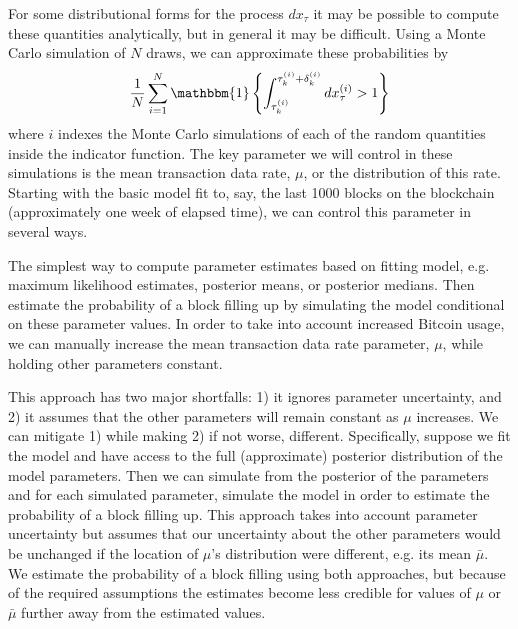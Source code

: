 \documentclass{article}
\begin{document}
For some distributional forms for the process $dx_\tau$ it may be possible to compute these quantities analytically, but in general it may be difficult. Using a Monte Carlo simulation of $N$ draws, we can approximate these probabilities by
\[
\frac{1}{N}\sum_{i=1}^N\mathbbm{1}\left\{\int_{\tau_k^{(i)}}^{\tau_{k}^{(i)}+\delta_k^{(i)}}dx_\tau^{(i)} > 1\right\}
\]
where $i$ indexes the Monte Carlo simulations of each of the random quantities inside the indicator function. The key parameter we will control in these simulations is the mean transaction data rate, $\mu$, or the distribution of this rate. Starting with the basic model fit to, say, the last 1000 blocks on the blockchain (approximately one week of elapsed time), we can control this parameter in several ways.

The simplest way to compute parameter estimates based on fitting model, e.g. maximum likelihood estimates, posterior means, or posterior medians. Then estimate the probability of a block filling up by simulating the model conditional on these parameter values. In order to take into account increased Bitcoin usage, we can manually increase the mean transaction data rate parameter, $\mu$, while holding other parameters constant. 

This approach has two major shortfalls: 1) it ignores parameter uncertainty, and 2) it assumes that the other parameters will remain constant as $\mu$ increases. We can mitigate 1) while making 2) if not worse, different. Specifically, suppose we fit the model and have access to the full (approximate) posterior distribution of the model parameters. Then we can simulate from the posterior of the parameters and for each simulated parameter, simulate the model in order to estimate the probability of a block filling up. This approach takes into account parameter uncertainty but assumes that our uncertainty about the other parameters would be unchanged if the location of $\mu$'s distribution were different, e.g. its mean $\bar{\mu}$. We estimate the probability of a block filling using both approaches, but because of the required assumptions the estimates become less credible for values of $\mu$ or $\bar{\mu}$ further away from the estimated values.
\end{document}

